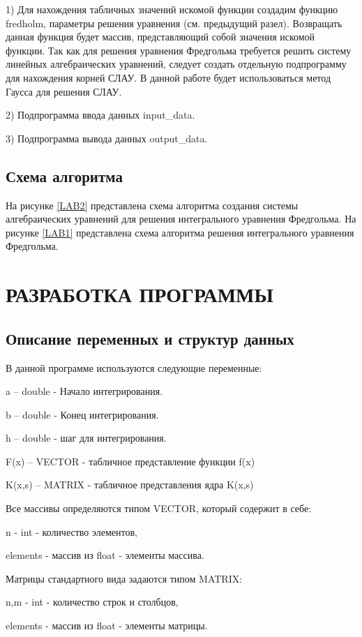 1) Для нахождения табличных значений искомой функции создадим функцию fredholm, параметры решения уравнения (см. предыдущий разел). Возвращать данная функция будет массив, представляющий собой значения искомой функции. Так как для решения уравнения Фредгольма требуется решить систему линейных алгебраических уравнений, следует создать отдельную подпрограмму для нахождения корней СЛАУ. В данной работе будет использоваться метод Гаусса для решения СЛАУ. 

2) Подпрограмма ввода данных input\_data.

3) Подпрограмма вывода данных output\_data.
\subsection{Схема алгоритма}
На рисунке \ref{LAB2} представлена схема алгоритма создания системы алгебраических уравнений для решения интегрального уравнения Фредгольма.
На рисунке \ref{LAB1} представлена схема алгоритма решения интегрального уравнения Фредгольма.
\section{РАЗРАБОТКА ПРОГРАММЫ}
\subsection{Описание переменных и структур данных}
В данной программе используются следующие переменные:

a – double - Начало интегрирования.

b – double - Конец интегрирования. 

h – double - шаг для интегрирования. 

F(x) – VECTOR - табличное представление функции f(x)

K(x,s) – MATRIX - табличное представления ядра K(x,s)

Все массивы определяются типом VECTOR, который содержит в себе:

n - int - количество элементов,

elements - массив из float - элементы массива.

Матрицы стандартного вида задаются типом MATRIX:

n,m - int - количество строк и столбцов,

elements - массив из float - элементы матрицы.

